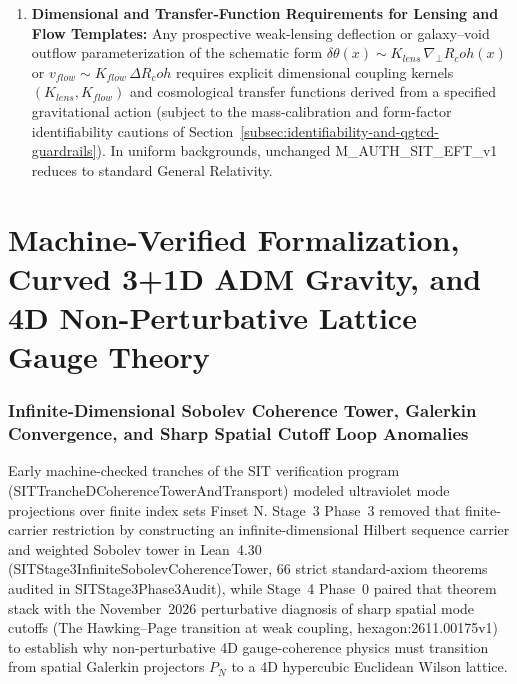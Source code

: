 \documentclass[american,11pt,letterpaper]{article}
\newcommand{\Rcoh}{R_{\mathrm{coh}}}
\def\mathbf#1{#1}%
\def\mathcal#1{#1}%
\def\mathrm#1{#1}%
\def\texttt#1{#1}%
\def\emph#1{#1}%
\def\Rcoh{R_coh}%
\begin{document}
\begin{enumerate}[leftmargin=2em]
\begin{equation}
  \label{eq:hubble_shift_corrected}
  \end{equation}
  (correcting the erroneous factor $1/(6\rho_{\mathrm{tot}})$ printed in earlier drafts). Whether $\langle\Rcoh\rangle(z)$ evolves cosmologically in a way consistent with CMB acoustic peaks, BAO, and supernova data remains an open Level-1 calculation (\texttt{OPEN-6D}).
  \item \textbf{Dimensional and Transfer-Function Requirements for Lensing and Flow Templates:} Any prospective weak-lensing deflection or galaxy--void outflow parameterization of the schematic form $\delta\theta(\mathbf{x}) \sim \mathcal{K}_{\mathrm{lens}}\,\nabla_\perp\Rcoh(\mathbf{x})$ or $v_{\mathrm{flow}} \sim \mathcal{K}_{\mathrm{flow}}\,\Delta\Rcoh$ requires explicit dimensional coupling kernels $(\mathcal{K}_{\mathrm{lens}}, \mathcal{K}_{\mathrm{flow}})$ and cosmological transfer functions derived from a specified gravitational action (subject to the mass-calibration and form-factor identifiability cautions of Section~\ref{subsec:identifiability-and-qgtcd-guardrails}). In uniform backgrounds, unchanged \texttt{M\_AUTH\_SIT\_EFT\_v1} reduces to standard General Relativity.
\end{enumerate}
\part{Machine-Verified Formalization, Curved 3+1D ADM Gravity, and 4D Non-Perturbative Lattice Gauge Theory}

\section{Infinite-Dimensional Sobolev Coherence Tower, Galerkin Convergence, and Sharp Spatial Cutoff Loop Anomalies}
\label{sec:stage3-sobolev}

Early machine-checked tranches of the SIT verification program (\texttt{SITTranche\allowbreak{}DCoherence\allowbreak{}Tower\allowbreak{}And\allowbreak{}Transport}) modeled ultraviolet mode projections over finite index sets \texttt{Finset N}. Stage~3 Phase~3 removed that finite-carrier restriction by constructing an infinite-dimensional Hilbert sequence carrier and weighted Sobolev tower in Lean~4.30 (\texttt{SITStage3\allowbreak{}Infinite\allowbreak{}Sobolev\allowbreak{}Coherence\allowbreak{}Tower}, $66$ strict standard-axiom theorems audited in \texttt{SITStage3Phase3Audit}), while Stage~4 Phase~0 paired that theorem stack with the November~2026 perturbative diagnosis of sharp spatial mode cutoffs (\emph{The Hawking--Page transition at weak coupling}, \texttt{hexagon:2611.00175v1}) to establish why non-perturbative 4D gauge-coherence physics must transition from spatial Galerkin projectors $P_N$ to a 4D hypercubic Euclidean Wilson lattice.
\end{document}
